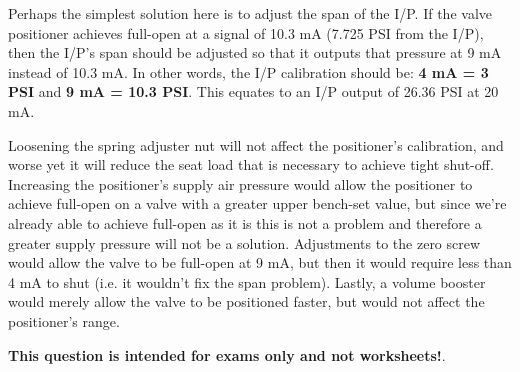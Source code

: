 \vskip 10pt

Perhaps the simplest solution here is to adjust the span of the I/P.  If the valve positioner achieves full-open at a signal of 10.3 mA (7.725 PSI from the I/P), then the I/P's span should be adjusted so that it outputs that pressure at 9 mA instead of 10.3 mA.  In other words, the I/P calibration should be: {\bf 4 mA = 3 PSI} and {\bf 9 mA = 10.3 PSI}.  This equates to an I/P output of 26.36 PSI at 20 mA.

\vskip 10pt

Loosening the spring adjuster nut will not affect the positioner's calibration, and worse yet it will reduce the seat load that is necessary to achieve tight shut-off.  Increasing the positioner's supply air pressure would allow the positioner to achieve full-open on a valve with a greater upper bench-set value, but since we're already able to achieve full-open as it is this is not a problem and therefore a greater supply pressure will not be a solution.  Adjustments to the zero screw would allow the valve to be full-open at 9 mA, but then it would require less than 4 mA to shut (i.e. it wouldn't fix the span problem).  Lastly, a volume booster would merely allow the valve to be positioned faster, but would not affect the positioner's range.







{\bf This question is intended for exams only and not worksheets!}.



